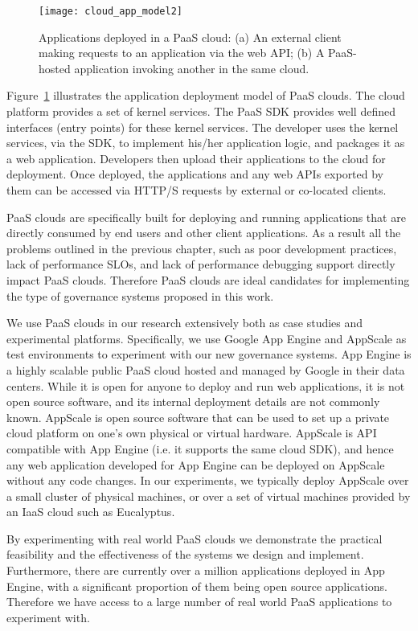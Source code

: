 \begin{figure}
\centering
\texttt{[image: cloud\_app\_model2]}
\caption{Applications deployed in a PaaS cloud: (a) An external client making requests
to an application via the web API;
(b) A PaaS-hosted application invoking another in the same cloud.
\label{fig:cloud_app_model}
}
\end{figure}

Figure~\ref{fig:cloud_app_model} illustrates the application deployment model of PaaS clouds. 
The cloud platform provides a set of kernel services. 
The PaaS SDK provides well defined interfaces (entry points) for these kernel services.  
The developer uses the kernel services, via the SDK, to implement his/her application logic, and packages 
it as a web application. Developers then
upload their applications to the cloud for deployment.
Once deployed, the applications and any web APIs exported by them can be accessed 
via HTTP/S requests by external or co-located clients.

PaaS clouds are specifically built for deploying and running applications
that are directly consumed by end users and other client applications. As a result all the problems 
outlined in the previous chapter, such as poor development practices, lack of performance SLOs, and lack of performance 
debugging support directly impact PaaS clouds. Therefore PaaS clouds are ideal candidates for implementing the type
of governance systems proposed in this work. 

We use PaaS clouds in our research extensively both as case studies
and experimental platforms. Specifically, we use Google App Engine and AppScale as test environments
to experiment with our new governance systems. App Engine is a highly scalable public PaaS cloud hosted and
managed by Google in their data centers. While it is open for anyone to deploy and run web applications, it is not
open source software, and its internal deployment details are not commonly known. AppScale is open source
software that can be used to set up a private cloud platform on one's own physical or virtual hardware. AppScale
is API compatible with App Engine (i.e. it supports the same cloud SDK), and hence any web application developed
for App Engine can be deployed on AppScale without any code changes. In our experiments, we typically deploy
AppScale over a small cluster of physical machines, or over a set of virtual machines provided by an IaaS cloud
such as Eucalyptus.

By experimenting with real world PaaS clouds we demonstrate the practical feasibility and the effectiveness of 
the systems we design and implement. Furthermore, there are currently over a million applications deployed
in App Engine, with a significant proportion of them being open source applications. Therefore we have access
to a large number of real world PaaS applications to experiment with.

